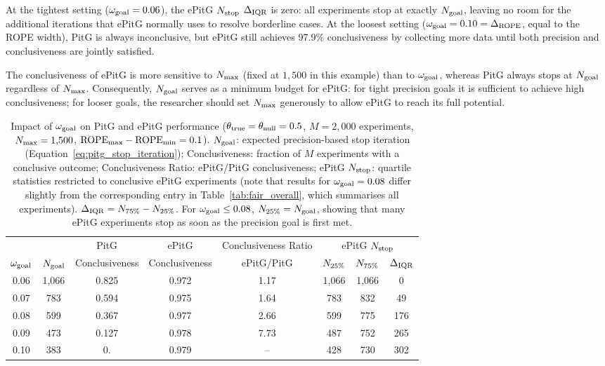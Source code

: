 At the tightest setting ($\omega_{\rm goal}=0.06$), the ePitG $N_{\rm stop}$ $\Delta_{\rm IQR}$ is zero:
all experiments stop at exactly $N_{\rm goal}$, leaving no room for the additional
iterations that ePitG normally uses to resolve borderline cases.
At the loosest setting ($\omega_{\rm goal}=0.10=\Delta_{\rm ROPE}$, equal to the ROPE width), PitG is always
inconclusive, but ePitG still achieves 97.9\% conclusiveness by collecting more data until
both precision and conclusiveness are jointly satisfied.

The conclusiveness of ePitG is more sensitive to $N_{\rm max}$ (fixed at $1{,}500$ in this
example) than to $\omega_{\rm goal}$, whereas PitG always stops at $N_{\rm goal}$ regardless of $N_{\rm max}$.
Consequently, $N_{\rm goal}$ serves as a minimum budget for ePitG: for tight precision goals
it is sufficient to achieve high conclusiveness; for looser goals, the researcher should
set $N_{\rm max}$ generously to allow ePitG to reach its full potential.

\begin{table}[h!]
  \begin{center}
  \begin{tabular}{c|c|c|c|c|c|c|c}
    \hline
    & &\multicolumn{1}{c|}{PitG} & \multicolumn{1}{c|}{ePitG} & \multicolumn{1}{c|}{Conclusiveness Ratio} & \multicolumn{3}{c}{ePitG $N_{\rm stop}$} \\
    $\omega_{\rm goal}$ & $N_{\rm goal}$ & Conclusiveness & Conclusiveness  &  ePitG/PitG & $ N_{\rm 25\%}$ &  $N_{\rm 75\%}$ & $\Delta_{\rm IQR}$\\
    \hline
    0.06 & 1,066 & 0.825 & 0.972 & 1.17 & 1,066 & 1,066 & 0 \\
    0.07 & 783 & 0.594 & 0.975 & 1.64 & 783 & 832 & 49 \\
    0.08 & 599 & 0.367 & 0.977 & 2.66 & 599 & 775 & 176 \\
    0.09 & 473 & 0.127 & 0.978 & 7.73 & 487 & 752 & 265 \\
    0.10 & 383 & 0.    & 0.979 & --  & 428 & 730 & 302 \\
    \hline
  \end{tabular}
  \caption{Impact of $\omega_{\rm goal}$ on PitG and ePitG performance
  ($\theta_{\rm true}=\theta_{\rm null}=0.5$, $M=2{,}000$ experiments,
  $N_{\rm max}=1{,}500$, ${\rm ROPE}_{\rm max}-{\rm ROPE}_{\rm min}=0.1$).
  $N_{\rm goal}$: expected precision-based stop iteration (Equation~\ref{eq:pitg_stop_iteration});
  Conclusiveness: fraction of $M$ experiments with a conclusive outcome;
  Conclusiveness Ratio: ePitG/PitG conclusiveness;
  ePitG $N_{\rm stop}$: quartile statistics restricted to conclusive ePitG
  experiments (note that results for $\omega_{\rm goal}=0.08$ differ slightly from
  the corresponding entry in Table~\ref{tab:fair_overall}, which summarises all experiments).
  $\Delta_{\rm IQR} = N_{\rm 75\%} - N_{\rm 25\%}$.
  For $\omega_{\rm goal} \le 0.08$, $N_{\rm 25\%} = N_{\rm goal}$, showing that many
  ePitG experiments stop as soon as the precision goal is first met.
 }
  \label{tab:goal_impact}
\end{center}
\end{table}

